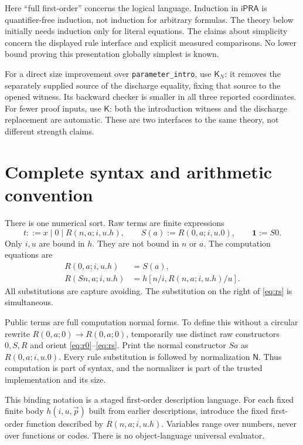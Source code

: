 \documentclass[11pt,letterpaper]{article}
\theoremstyle{definition}\newtheorem{definition}[theorem]{Definition}
\theoremstyle{remark}\newtheorem{remark}[theorem]{Remark}
\newcommand{\ipra}{\mathsf{iPRA}}
\newcommand{\K}{\mathsf K}
\newcommand{\KN}{\mathsf K_{\!N}}
\newcommand{\NF}{\mathsf N}
\newcommand{\one}{\mathbf 1}
\newcommand{\file}[1]{{\small\nolinkurl{#1}}}
\begin{document}
Here ``full first-order'' concerns the logical language. Induction in
$\ipra$ is quantifier-free induction, not induction for arbitrary formulas.
The theory below initially needs induction only for literal equations.
The claims about simplicity concern the displayed rule interface and
explicit measured comparisons. No lower bound proving this presentation
globally simplest is known.

For a direct size improvement over \file{parameter_intro}, use $\KN$:
it removes the separately supplied source of the discharge equality,
fixing that source to the opened witness. Its backward checker is
smaller in all three reported coordinates. For fewer proof inputs, use
$\K$: both the introduction witness and the discharge replacement are
automatic. These are two interfaces to the same theory, not different
strength claims.

\section{Complete syntax and arithmetic convention}\label{sec:syntax}
There is one numerical sort. Raw terms are finite expressions
\[
 t::=x\mid 0\mid R(n,a;i,u.h),
 \qquad S(a):=R(0,a;i,u.0),\qquad \one:=S0.
\]
Only $i,u$ are bound in $h$. They are not bound in $n$ or $a$.
The computation equations are
\begin{align}
 R(0,a;i,u.h)&=S(a),\label{eq:r0}\\
 R(Sn,a;i,u.h)&=h[n/i,R(n,a;i,u.h)/u].\label{eq:rs}
\end{align}
All substitutions are capture avoiding. The substitution on the right of
\eqref{eq:rs} is simultaneous.

Public terms are full computation normal forms. To define this without a
circular rewrite $R(0,a;0)\to R(0,a;0)$, temporarily use distinct raw
constructors $0,S,R$ and orient \eqref{eq:r0}--\eqref{eq:rs}. Print the
normal constructor $Sa$ as $R(0,a;i,u.0)$. Every rule substitution is
followed by normalization $\NF$. Thus computation is part of syntax,
and the normalizer is part of the trusted implementation and its size.

This binding notation is a staged first-order description language. For
each fixed finite body $h(i,u,\vec p)$ built from earlier descriptions,
introduce the fixed first-order function described by $R(n,a;i,u.h)$.
Variables range over numbers, never over functions or codes. There is no
object-language universal evaluator.
\end{document}

